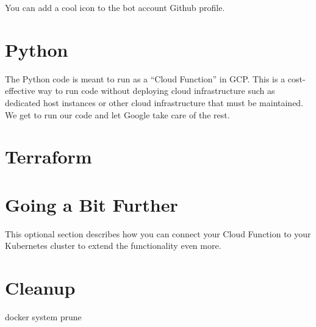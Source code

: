 \justifying
You can add a cool icon to the bot account Github profile.


\section{\label{sec:Python}Python}

\justifying
The Python code is meant to run as a ``Cloud Function'' in GCP. This is a cost-effective way to run code
without deploying cloud infrastructure such as dedicated host instances or other cloud infrastructure
that must be maintained. We get to run our code and let Google take care of the rest.

\section{\label{sec:Terraform}Terraform}

\section{\label{sec:next}Going a Bit Further}

\justifying
This optional section describes how you can connect your Cloud Function to your Kubernetes cluster to extend the functionality even more.

\section{\label{sec:cleanup}Cleanup}

\justifying

docker system prune


\clearpage
\begin{versionhistory}
\end{versionhistory}

\clearpage




